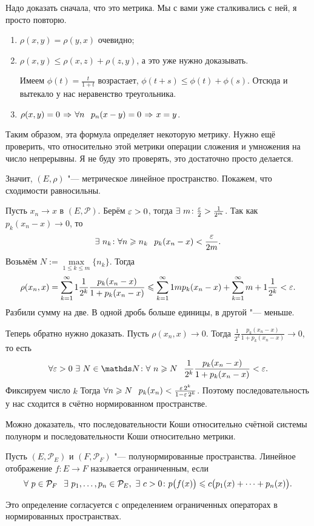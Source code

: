 \begin{Proof}
  Надо доказать сначала, что это метрика. Мы с вами уже сталкивались с ней, я просто повторю.
\begin{enumerate}
\item $\rho(x,y) = \rho(y,x)$ очевидно;
\item $\rho(x,y)\le\rho(x,z) + \rho(z,y)$, а это уже нужно доказывать.

Имеем $\phi(t) = \frac t{1+t}$ возрастает, $\phi(t+s)\le \phi(t) + \phi(s)$. Отсюда и вытекало у нас неравенство треугольника.

\item $\rho(x,y)=0\imp \forall n\pau p_n(x-y)=0\imp x=y$.
\end{enumerate}
Таким образом, эта формула определяет некоторую метрику. Нужно ещё проверить, что относительно этой метрики операции сложения и умножения на число непрерывны. Я не буду это проверять, это достаточно просто делается.

Значит, $(E,\rho)$ "--- метрическое линейное пространство. Покажем, что сходимости равносильны.

Пусть $x_n\to x$ в $(E,\mathcal P)$. Берём $\varepsilon>0$, тогда $\exists\ m\colon \frac{\varepsilon}2 >\frac1{2^m}$. Так как $p_k(x_n-x)\to0$, то 
\[\exists\ n_k\colon \forall n\ge n_k\pau  p_k(x_n-x)<\frac\e{2m}.
\]
Возьмём $N:=\max\limits_{1\le k\le m}\{n_k\}$. Тогда
\[
  \rho(x_n,x) = \sum\limits_{{k}={1}}^\infty1\frac1{2^k}\frac{p_k(x_n-x)}{1+p_k(x_n-x)}\leqslant
  \sum\limits_{{k}={1}}^\infty1mp_k(x_n-x) + \sum\limits_{{k}={1}}^\infty{m+1}\frac1{2^k} < \varepsilon.
\]
Разбили сумму на две. В одной дробь больше единицы, в другой "--- меньше.

Теперь обратно нужно доказать. Пусть $\rho(x_n,x)\to0$. Тогда 
$\frac1{2^k}\frac{p_k(x_n-x)}{1+p_k(x_n-x)}\to0$, то есть
\[
  \forall \e>0\ \exists\ N\in\N\colon \forall\ n\ge N\pau
  \frac1{2^k}\frac{p_k(x_n-x)}{1+p_k(x_n-x)}<\e.
\]
Фиксируем число $k$ Тогда $\forall n\ge N\pau p_k(x_n) <\frac{\e\,2^k}{1-\e\,2^k}$. Поэтому последовательность у нас сходится в счётно нормированном пространстве.

\end{Proof}
Можно доказатель, что последовательности Коши относительно счётной системы полунорм и последовательности Коши относительно метрики.

\begin{Def}
Пусть $(E,\mathcal P_E)$ и $(F,\mathcal P_F)$ "--- полунормированные пространства. Линейное отображение $f\colon E\to F$ называется ограниченным, если
\[
  \forall\ p\in\mathcal P_F\pau \exists\ p_1,\dots,p_n\in\mathcal P_E,\ \exists\ c>0\colon 
  p\big(f(x)\big)\le c\big(p_1(x) + \dots + p_n(x)\big).
\]
\end{Def}
Это определение согласуется с определением ограниченных операторах в нормированных пространствах.

